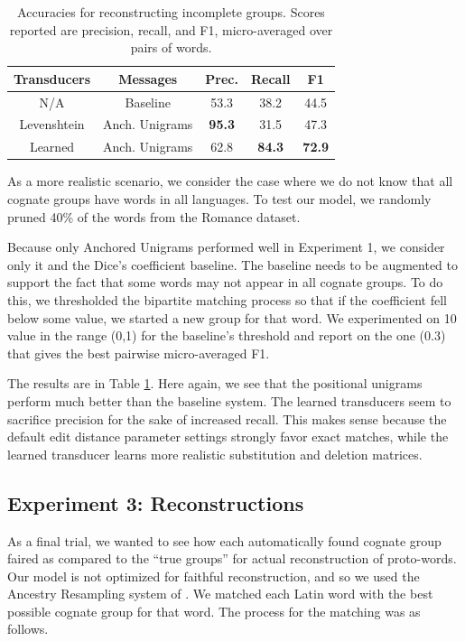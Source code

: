 \documentclass[11pt,a4paper]{article}
\begin{document}
\begin{table}
  \small
  { 
  \begin{tabular}{|c|c|c|c|c|}
    \hline
    Transducers & Messages & Prec. & Recall & F1 \\
    \hline
    N/A & Baseline & 53.3 & 38.2 & 44.5 \\
    Levenshtein&Anch. Unigrams & \textbf{95.3} & 31.5 & 47.3\\
    Learned&Anch. Unigrams  & 62.8 & \textbf{84.3} & \textbf{72.9} \\
    \hline
  \end{tabular}
  \caption{Accuracies for reconstructing incomplete groups. Scores
  reported are precision, recall, and F1, micro-averaged over pairs of words.}
  \label{tbl:partial}
 }
\end{table}

As a more realistic scenario, we consider the case where we do not
know that all cognate groups have words in all languages. To test
our model, we randomly pruned 40\% of the words from the Romance
dataset.

Because only Anchored Unigrams performed well in Experiment 1, we
consider only it and the Dice's coefficient baseline. The baseline
needs to be augmented to support the fact that some words may not
appear in all cognate groups. To do this, we thresholded the bipartite
matching process so that if the coefficient fell below some value,
we started a new group for that word. We experimented on 10 value
in the range (0,1) for the baseline's threshold and report on the
one (0.3) that gives the best pairwise micro-averaged F1.

The results are in Table \ref{tbl:partial}. Here again, we see that
the positional unigrams perform much better than the baseline system.
The learned transducers seem to sacrifice precision for the sake
of increased recall. This makes sense because the default edit
distance parameter settings strongly favor exact matches, while the
learned transducer learns more realistic substitution and deletion
matrices.

\subsection{Experiment 3: Reconstructions}

As a final trial, we wanted to see how each automatically found
cognate group faired as compared to the ``true groups'' for actual
reconstruction of proto-words. Our model is not optimized for
faithful reconstruction, and so we used the Ancestry Resampling
system of . We matched each Latin word
with the best possible cognate group for that word. The process for
the matching was as follows.
\end{document}
